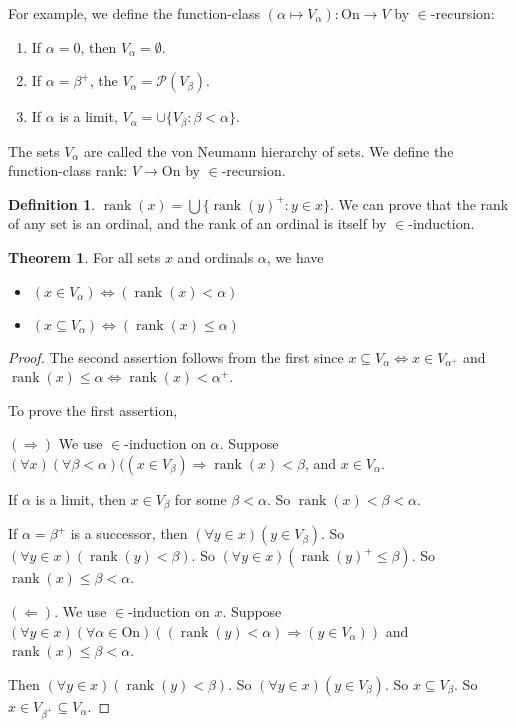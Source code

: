 \documentclass[a4paper]{article}
\theoremstyle{definition}
\newtheorem*{thm}{Theorem}
\newtheorem*{defi}{Definition}
\newcommand{\On}{\mathrm{On}}
\DeclareMathOperator\rank{rank}
\begin{document}
For example, we define the function-class $(\alpha\mapsto V_\alpha): \On\to V$ by $\in$-recursion:
\begin{enumerate}
\item If $\alpha = 0$, then $V_\alpha = \emptyset$.
\item If $\alpha = \beta^+$, the $V_{\alpha} = \mathcal{P}(V_\beta)$.
\item If $\alpha$ is a limit, $V_{\alpha} = \cup\{V_\beta: \beta < \alpha\}$.
\end{enumerate}

The sets $V_\alpha$ are called the von Neumann hierarchy of sets. We define the function-class rank: $V\to \On$ by $\in$-recursion.

\begin{defi}
  $\rank(x) = \bigcup \{\rank(y)^+: y\in x\}$. We can prove that the rank of any set is an ordinal, and the rank of an ordinal is itself by $\in$-induction.
\end{defi}

\begin{thm}
  For all sets $x$ and ordinals $\alpha$, we have
  \begin{itemize}
  \item $(x\in V_\alpha) \Leftrightarrow (\rank (x)< \alpha)$
  \item $(x\subseteq V_\alpha) \Leftrightarrow (\rank (x) \leq \alpha)$ 
  \end{itemize}
\end{thm}

\begin{proof}
  The second assertion follows from the first since $x\subseteq V_\alpha\Leftrightarrow x\in V_{\alpha^+}$ and $\rank (x) \leq \alpha\Leftrightarrow \rank(x) < \alpha^+$.

  To prove the first assertion,

  $(\Rightarrow)$ We use $\in$-induction on $\alpha$. Suppose $(\forall x)(\forall \beta < \alpha)((x\in V_\beta)\Rightarrow \rank(x) < \beta$, and $x\in V_\alpha$. 

  If $\alpha$ is a limit, then $x\in V_\beta$ for some $\beta < \alpha$. So $\rank (x) < \beta < \alpha$.

  If $\alpha = \beta^+$ is a successor, then $(\forall y\in x)(y\in V_\beta)$. So $(\forall y\in x)(\rank (y) < \beta)$. So $(\forall y\in x)(\rank (y)^+ \leq \beta)$. So $\rank (x) \leq \beta < \alpha$. 

  $(\Leftarrow)$. We use $\in$-induction on $x$. Suppose $(\forall y\in x)(\forall \alpha\in \On)((\rank(y) < \alpha)\Rightarrow (y\in V_\alpha))$ and $\rank(x) \leq \beta < \alpha$.

  Then $(\forall y\in x)(\rank (y) < \beta)$. So $(\forall y\in x)(y\in V_\beta)$. So $x\subseteq V_\beta$. So $x\in V_{\beta^+} \subseteq V_\alpha$. 
\end{proof}
\end{document}
